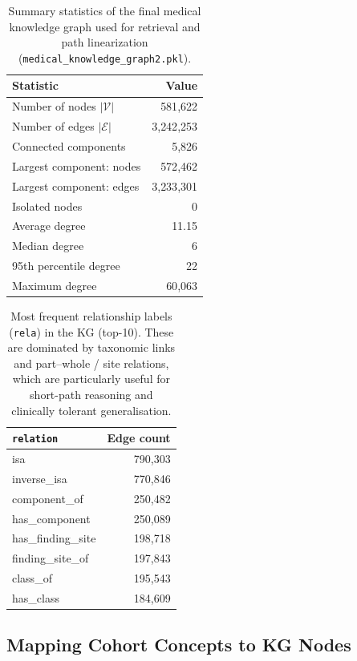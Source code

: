 \begin{table}[t]
\centering
\caption{Summary statistics of the final medical knowledge graph used for retrieval and path linearization (\texttt{medical\_knowledge\_graph2.pkl}).}
\label{tab:kg-summary}
\begin{tabular}{l r}
\toprule
\textbf{Statistic} & \textbf{Value} \\
\midrule
Number of nodes $|\mathcal{V}|$ & 581{,}622 \\
Number of edges $|\mathcal{E}|$ & 3{,}242{,}253 \\
Connected components & 5{,}826 \\
Largest component: nodes & 572{,}462 \\
Largest component: edges & 3{,}233{,}301 \\
Isolated nodes & 0 \\
Average degree & 11.15 \\
Median degree & 6 \\
95th percentile degree & 22 \\
Maximum degree & 60{,}063 \\
\bottomrule
\end{tabular}
\end{table}


\begin{table}[t]
\centering
\caption{Most frequent relationship labels (\texttt{rela}) in the KG (top-10). These are dominated by taxonomic links and part--whole / site relations, which are particularly useful for short-path reasoning and clinically tolerant generalisation.}
\label{tab:kg-rela-top10}
\begin{tabular}{l r}
\toprule
\textbf{\texttt{relation}} & \textbf{Edge count} \\
\midrule
isa & 790{,}303 \\
inverse\_isa & 770{,}846 \\
component\_of & 250{,}482 \\
has\_component & 250{,}089 \\
has\_finding\_site & 198{,}718 \\
finding\_site\_of & 197{,}843 \\
class\_of & 195{,}543 \\
has\_class & 184{,}609 \\
\bottomrule
\end{tabular}
\end{table}


\subsection{Mapping Cohort Concepts to KG Nodes}
\label{subsec:kg-mapping}

